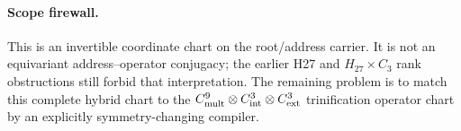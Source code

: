 \paragraph{Scope firewall.}
This is an invertible coordinate chart on the root/address carrier.  It is not
an equivariant address--operator conjugacy; the earlier H27 and
$H_{27}\times C_3$ rank obstructions still forbid that interpretation.  The
remaining problem is to match this complete hybrid chart to the
$C^9_{\rm mult}\otimes C^3_{\rm int}\otimes C^3_{\rm ext}$ trinification
operator chart by an explicitly symmetry-changing compiler.
